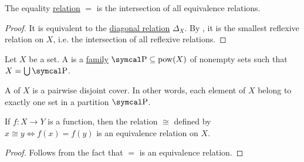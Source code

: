 \begin{proposition}\label{thm:equality_is_smallest_equivalence_relation}
  The equality \hyperref[def:relation]{relation} \( = \) is the intersection of all equivalence relations.
\end{proposition}
\begin{proof}
  It is equivalent to the \hyperref[def:binary_relation/diagonal]{diagonal relation} \( \Delta_X \). By , it is the smallest reflexive relation on \( X \), i.e. the intersection of all reflexive relations.
\end{proof}

\begin{definition}\label{def:set_partition}
  Let \( X \) be a set. A  is a \hyperref[rem:family_of_sets]{family} \( \CP \subseteq \Pow(X) \) of nonempty sets such that \( X = \bigcup \CP \).

  A  of \( X \) is a pairwise disjoint cover. In other words, each element of \( X \) belong to exactly one set in a partition \( \CP \).
\end{definition}

\begin{lemma}\label{thm:equivalence_relation_inheriance}
  If \( f: X \to Y \) is a function, then the relation \( \cong \) defined by \( x \cong y \iff f(x) = f(y) \) is an equivalence relation on \( X \).
\end{lemma}
\begin{proof}
  Follows from the fact that \( = \) is an equivalence relation.
\end{proof}

